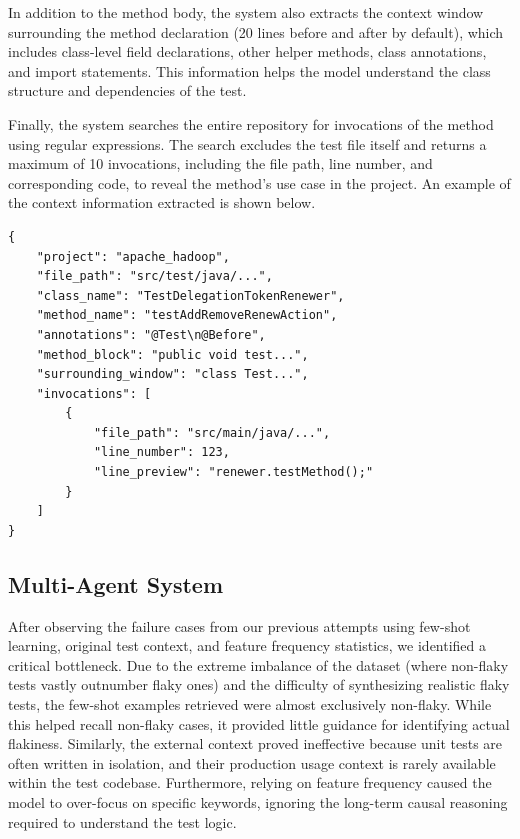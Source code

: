 \documentclass{article}
\begin{document}
In addition to the method body, the system also extracts the context window surrounding the method declaration (20 lines before and after by default), which includes class-level field declarations, other helper methods, class annotations, and import statements. This information helps the model understand the class structure and dependencies of the test.

Finally, the system searches the entire repository for invocations of the method using regular expressions. The search excludes the test file itself and returns a maximum of 10 invocations, including the file path, line number, and corresponding code, to reveal the method's use case in the project. An example of the context information extracted is shown below.

\begin{lstlisting}[style=mystyle, caption=Example Context Information, label=lst:json_example]
{
    "project": "apache_hadoop",
    "file_path": "src/test/java/...",
    "class_name": "TestDelegationTokenRenewer",
    "method_name": "testAddRemoveRenewAction",
    "annotations": "@Test\n@Before",          
    "method_block": "public void test...",     
    "surrounding_window": "class Test...",    
    "invocations": [                           
        {
            "file_path": "src/main/java/...",
            "line_number": 123,
            "line_preview": "renewer.testMethod();"
        }
    ]
}
\end{lstlisting}

\subsection{Multi-Agent System}

After observing the failure cases from our previous attempts using few-shot learning, original test context, and feature frequency statistics, we identified a critical bottleneck. Due to the extreme imbalance of the dataset (where non-flaky tests vastly outnumber flaky ones) and the difficulty of synthesizing realistic flaky tests, the few-shot examples retrieved were almost exclusively non-flaky. While this helped recall non-flaky cases, it provided little guidance for identifying actual flakiness. Similarly, the external context proved ineffective because unit tests are often written in isolation, and their production usage context is rarely available within the test codebase. Furthermore, relying on feature frequency caused the model to over-focus on specific keywords, ignoring the long-term causal reasoning required to understand the test logic.
\end{document}
